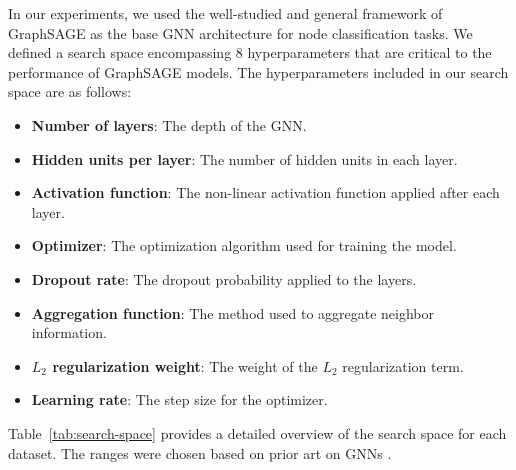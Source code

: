 In our experiments, we used the well-studied and general framework of GraphSAGE \cite{hamilton_inductive_2017} as the base GNN architecture for node classification tasks. We defined a search space encompassing 8 hyperparameters that are critical to the performance of GraphSAGE models. The hyperparameters included in our search space are as follows:
\begin{itemize}
	\item \textbf{Number of layers}: The depth of the GNN.
	\item \textbf{Hidden units per layer}: The number of hidden units in each layer.
	\item \textbf{Activation function}: The non-linear activation function applied after each layer.
	\item \textbf{Optimizer}: The optimization algorithm used for training the model.
	\item \textbf{Dropout rate}: The dropout probability applied to the layers.
	\item \textbf{Aggregation function}: The method used to aggregate neighbor information.
	\item \textbf{\( L_2 \) regularization weight}: The weight of the \( L_2 \) regularization term.
	\item \textbf{Learning rate}: The step size for the optimizer.
\end{itemize}
Table~\ref{tab:search-space} provides a detailed overview of the search space for each dataset. The ranges were chosen based on prior art on GNNs \cite{bronstein_geometric_2021, hamilton_inductive_2017, zeng_graphsaint_2019, zhu_beyond_2020, yang_vqgraph_2023, den_boef_graphpope_2021, li_finding_2022}.

